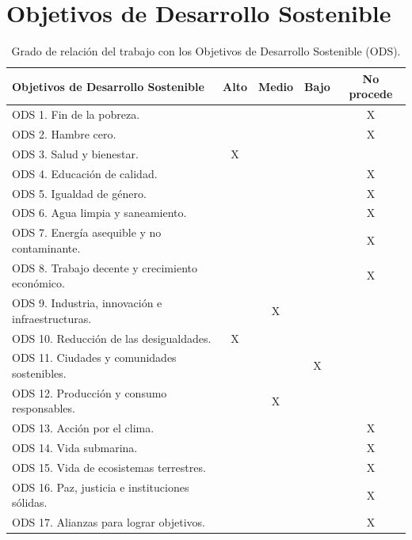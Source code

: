 \documentclass[11pt,spanish,listoffigures,listoftables]{tfgetsinf}
\begin{document}

\APPENDIX


\chapter{Objetivos de Desarrollo Sostenible}

\begin{table}[H]
\centering
\caption{Grado de relación del trabajo con los Objetivos de Desarrollo Sostenible (ODS).}
\begin{tabular}{|p{7cm}|c|c|c|c|}
\hline
\textbf{Objetivos de Desarrollo Sostenible} & \textbf{Alto} & \textbf{Medio} & \textbf{Bajo} & \textbf{No procede} \\
\hline
ODS 1. Fin de la pobreza. & & & & X \\
ODS 2. Hambre cero. & & & & X \\
ODS 3. Salud y bienestar. & X & & & \\
ODS 4. Educación de calidad. & & & & X \\
ODS 5. Igualdad de género. & & & & X \\
ODS 6. Agua limpia y saneamiento. & & & & X \\
ODS 7. Energía asequible y no contaminante. & & & & X \\
ODS 8. Trabajo decente y crecimiento económico. & & & & X \\
ODS 9. Industria, innovación e infraestructuras. & & X & & \\
ODS 10. Reducción de las desigualdades. & X & & & \\
ODS 11. Ciudades y comunidades sostenibles. & & & X & \\
ODS 12. Producción y consumo responsables. & & X & & \\
ODS 13. Acción por el clima. & & & & X \\
ODS 14. Vida submarina. & & & & X \\
ODS 15. Vida de ecosistemas terrestres. & & & & X \\
ODS 16. Paz, justicia e instituciones sólidas. & & & & X \\
ODS 17. Alianzas para lograr objetivos. & & & & X \\
\hline
\end{tabular}
\end{table}
\end{document}
